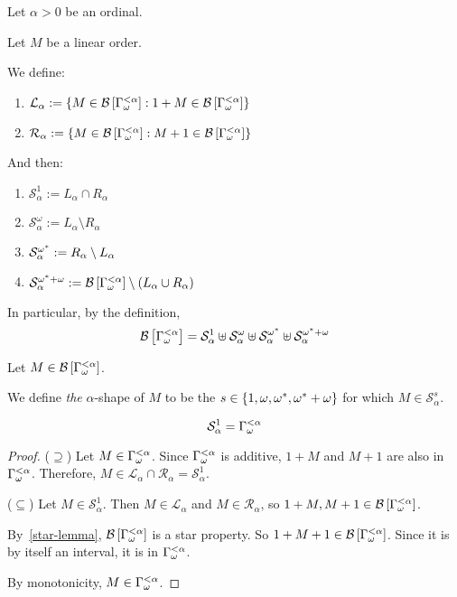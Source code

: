 \begin{definitions}
  Let $\alpha > 0$ be an ordinal.

  Let $M$ be a linear order.

  We define:
  \begin{enumerate}
    \item $\mathcal{L}_{\alpha} := \left\{ {M \in \mathcal{B} \left[ {{\Gamma_{\omega}^{< \alpha}}} \right] : 1 + M \in \mathcal{B} \left[ {{\Gamma_{\omega}^{< \alpha}}} \right]} \right\}$
    \item $\mathcal{R}_{\alpha} := \left\{ {M \in \mathcal{B} \left[ {{\Gamma_{\omega}^{< \alpha}}} \right] : M + 1 \in \mathcal{B} \left[ {{\Gamma_{\omega}^{< \alpha}}} \right]} \right\}$
  \end{enumerate}

  And then:
  \begin{enumerate}
    \item $\mathcal{S}^{1}_{\alpha} := L_{\alpha} \cap R_{\alpha}$
    \item $\mathcal{S}^{\omega}_{\alpha} := L_{\alpha} \setminus R_{\alpha}$
    \item $\mathcal{S}^{\omega^\ast}_{\alpha} := R_{\alpha} \setminus L_{\alpha}$
    \item $\mathcal{S}^{\omega^\ast + \omega}_{\alpha} := \mathcal{B} \left[ {{\Gamma_{\omega}^{< \alpha}}} \right] \setminus (L_{\alpha} \cup R_{\alpha})$
  \end{enumerate}

  In particular, by the definition,
  \[
    \mathcal{B} \left[ {{\Gamma_{\omega}^{< \alpha}}} \right]
    = \mathcal{S}^{1}_{\alpha}
    \uplus \mathcal{S}^{\omega}_{\alpha}
    \uplus \mathcal{S}^{\omega^\ast}_{\alpha}
    \uplus \mathcal{S}^{\omega^\ast + \omega}_{\alpha}
  \]

  Let $M \in \mathcal{B} \left[ {{\Gamma_{\omega}^{< \alpha}}} \right]$.

  We define \emph{the} $\alpha$-shape
  of $M$ to be the $s \in \left\{ {1, \omega, \omega^\ast, \omega^\ast + \omega} \right\}$
  for which $M \in \mathcal{S}^{s}_{\alpha}$.
\end{definitions}

\begin{lemma}
  
\end{lemma}

\begin{lemma}\label{b_alpha-structure-lemma-1}
  \[
    \mathcal{S}^{1}_{\alpha} = \Gamma_{\omega}^{< \alpha}
  \]
\end{lemma}

\begin{proof}
  ($\supseteq$) Let $M \in \Gamma_{\omega}^{< \alpha}$.
  Since $\Gamma_{\omega}^{< \alpha}$ is additive, $1 + M$ and $M + 1$ are also in $\Gamma_{\omega}^{< \alpha}$.
  Therefore, $M \in \mathcal{L}_{\alpha} \cap \mathcal{R}_{\alpha}
    = \mathcal{S}^{1}_{\alpha}$.

  ($\subseteq$) Let $M \in \mathcal{S}^{1}_{\alpha}$.
  Then $M \in \mathcal{L}_{\alpha}$ and $M \in \mathcal{R}_{\alpha}$,
  so $1 + M, M + 1 \in \mathcal{B} \left[ {{\Gamma_{\omega}^{< \alpha}}} \right]$.

  By~\cref{star-lemma}, $\mathcal{B} \left[ {{\Gamma_{\omega}^{< \alpha}}} \right]$ is a star property.
  So $1 + M + 1 \in \mathcal{B} \left[ {{\Gamma_{\omega}^{< \alpha}}} \right]$. Since it is by itself
  an interval, it is in $\Gamma_{\omega}^{< \alpha}$.

  By monotonicity, $M \in \Gamma_{\omega}^{< \alpha}$.
\end{proof}

